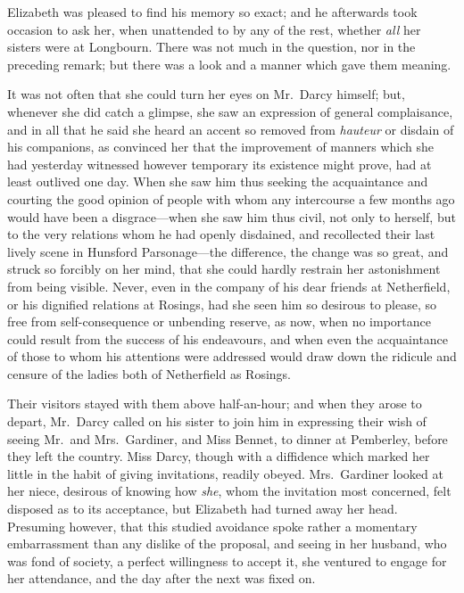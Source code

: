 \documentclass[12pt,english,oneside]{book}
\begin{document}
Elizabeth was pleased to find his memory so exact; and he afterwards
took occasion to ask her, when unattended to by any of the rest, whether
\textit{all} her sisters were at Longbourn. There was not much in
the question, nor in the preceding remark; but there was a look and
a manner which gave them meaning.

It was not often that she could turn her eyes on Mr.\ Darcy himself;
but, whenever she did catch a glimpse, she saw an expression of general
complaisance, and in all that he said she heard an accent so removed
from \emph{hauteur} or disdain of his companions, as convinced her
that the improvement of manners which she had yesterday witnessed
however temporary its existence might prove, had at least outlived
one day. When she saw him thus seeking the acquaintance and courting
the good opinion of people with whom any intercourse a few months
ago would have been a disgrace\mbox{---}when she saw him thus civil,
not only to herself, but to the very relations whom he had openly
disdained, and recollected their last lively scene in Hunsford Parsonage\mbox{---}the
difference, the change was so great, and struck so forcibly on her
mind, that she could hardly restrain her astonishment from being visible.
Never, even in the company of his dear friends at Netherfield, or
his dignified relations at Rosings, had she seen him so desirous to
please, so free from self-consequence or unbending reserve, as now,
when no importance could result from the success of his endeavours,
and when even the acquaintance of those to whom his attentions were
addressed would draw down the ridicule and censure of the ladies both
of Netherfield as Rosings.

Their visitors stayed with them above half-an-hour; and when they
arose to depart, Mr.\ Darcy called on his sister to join him in expressing
their wish of seeing Mr.\ and Mrs.\ Gardiner, and Miss Bennet, to
dinner at Pemberley, before they left the country. Miss Darcy, though
with a diffidence which marked her little in the habit of giving invitations,
readily obeyed. Mrs.\ Gardiner looked at her niece, desirous of knowing
how \textit{she}, whom the invitation most concerned, felt disposed
as to its acceptance, but Elizabeth had turned away her head. Presuming
however, that this studied avoidance spoke rather a momentary embarrassment
than any dislike of the proposal, and seeing in her husband, who was
fond of society, a perfect willingness to accept it, she ventured
to engage for her attendance, and the day after the next was fixed
on.
\end{document}
